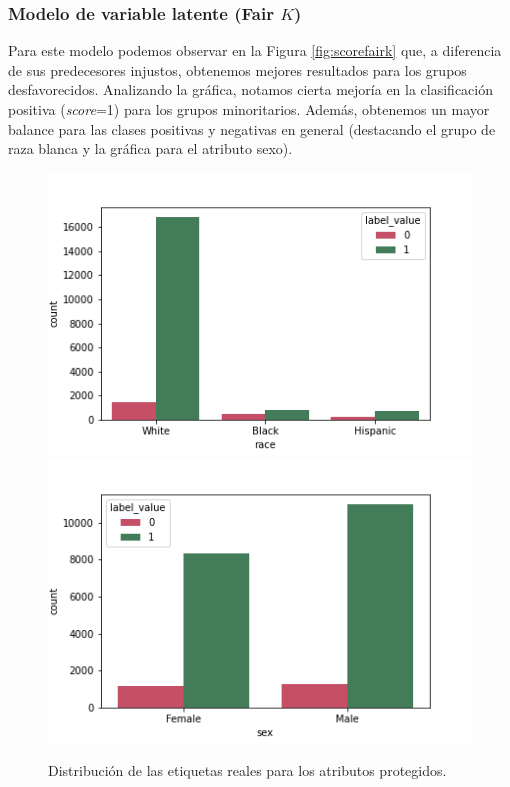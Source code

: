 \documentclass[oneside,openright,titlepage,numbers=noenddot,openany,headinclude,footinclude=true,
cleardoublepage=empty,abstractoff,BCOR=5mm,paper=a4,fontsize=12pt,main=spanish]{scrreprt}
\begin{document}
\subsubsection*{Modelo de variable latente (Fair $K$)}

Para este modelo podemos observar en la Figura \ref{fig:scorefairk} que, a diferencia de sus predecesores injustos, obtenemos mejores resultados para los grupos desfavorecidos. Analizando la gráfica, notamos cierta mejoría en la clasificación positiva (\textit{score}=1) para los grupos minoritarios. Además, obtenemos un mayor balance para las clases positivas y negativas en general (destacando el grupo de raza blanca y la gráfica para el atributo sexo).\\

\begin{figure}[H]
      \includegraphics[width=\linewidth]{images/label_race_law_2.png}
    \endminipage\hfill
      \includegraphics[width=\linewidth]{images/label_sex_law_2.png}
    \endminipage
     \caption{Distribución de las etiquetas reales para los atributos protegidos.}
     \label{fig:labelracesex2}
\end{figure}
\end{document}
